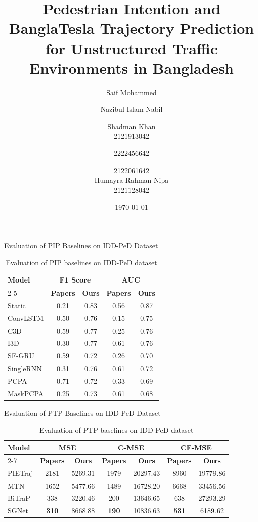 \documentclass[
	11pt, %
]{beamer}
\title[BDD-PeD]{Pedestrian Intention and BanglaTesla Trajectory Prediction for Unstructured Traffic Environments in Bangladesh} %
\subtitle{} %
\author[Group 2, CSE499A.2]{Saif Mohammed \and Nazibul Islam Nabil \and Shadman Khan 
\\ 2121913042 \and \hspace{1cm} 2222456642 \hspace{1cm} \and  2122061642 \\
Humayra Rahman Nipa \\
 2121128042}\\
\institute[NSU]{North South University \\ \smallskip \textit{Department of Electrical \& Computer Engineering}} %
\date[\today]{ \today} %
\begin{document}


\begin{frame}
    \titlepage
\end{frame}



\begin{frame}{Evaluation of PIP Baselines on IDD-PeD Dataset}
\begin{table}[ht]
\centering
\begin{tabular}{lcccc}
\hline
\textbf{Model} & \multicolumn{2}{c}{\textbf{F1 Score}} & \multicolumn{2}{c}{\textbf{AUC}} \\
\cline{2-5}
 & \textbf{Papers} & \textbf{Ours} & \textbf{Papers} & \textbf{Ours} \\
\hline
Static      & 0.21 & 0.83 & 0.56 & 0.87 \\
ConvLSTM    & 0.50 & 0.76 & 0.15 & 0.75 \\
C3D         & 0.59 & 0.77 & 0.25 & 0.76 \\
I3D         & 0.30 & 0.77 & 0.61 & 0.76 \\
SF-GRU      & 0.59 & 0.72 & 0.26 & 0.70 \\
SingleRNN   & 0.31 & 0.76 & 0.61 & 0.72 \\
PCPA        & 0.71 & 0.72 & 0.33 & 0.69 \\
MaskPCPA    & 0.25 & 0.73 & 0.61 & 0.68 \\
\hline
\end{tabular}
\caption{Evaluation of PIP baselines on IDD-PeD dataset}
\end{table}
\end{frame}


\begin{frame}{Evaluation of PTP Baselines on IDD-PeD Dataset}
\begin{table}[ht]
\centering
\begin{tabular}{lcccccc}
\hline
\textbf{Model} & \multicolumn{2}{c}{\textbf{MSE}} & \multicolumn{2}{c}{\textbf{C-MSE}} & \multicolumn{2}{c}{\textbf{CF-MSE}} \\
\cline{2-7}
 & \textbf{Papers} & \textbf{Ours} & \textbf{Papers} & \textbf{Ours} & \textbf{Papers} & \textbf{Ours} \\
\hline
PIETraj & 2181 & 5269.31 & 1979 & 20297.43 & 8960 & 19779.86 \\
MTN  & 1652 & 5477.66 & 1489 & 16728.20 & 6668 & 33456.56 \\
BiTraP & 338  & 3220.46 & 200  & 13646.65 & 638  & 27293.29 \\
SGNet & \textbf{310} & 8668.88 & \textbf{190} & 10836.63 & \textbf{531} & 6189.62 \\
\hline
\end{tabular}
\caption{Evaluation of PTP baselines on IDD-PeD dataset}
\end{table}
\end{frame}
\end{document}
